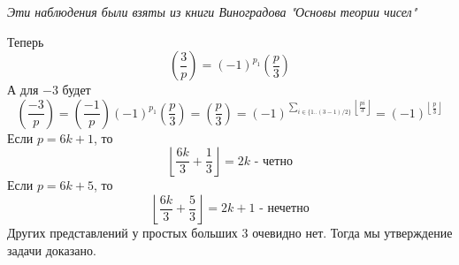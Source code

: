 \documentclass{article}
\begin{document}
\begin{enumerate}
        \textit{Эти наблюдения были взяты из книги Виноградова "Основы теории чисел"}

        Теперь
        \[\left(\frac{3}{p}\right)=(-1)^{p_1}\left(\frac{p}{3}\right)\]
        А для $-3$ будет
        \[\left(\frac{-3}{p}\right)=\left(\frac{-1}{p}\right)(-1)^{p_1}\left(\frac{p}{3}\right)
        =\left(\frac{p}{3}\right)=(-1)^{\sum_{i\in\{1..(3-1)/2\}}\left\lfloor\frac{pi}{3}\right\rfloor}
        =(-1)^{\left\lfloor\frac{p}{3}\right\rfloor}\]
        Если $p=6k+1$, то
        \[\left\lfloor\frac{6k}{3}+\frac{1}{3}\right\rfloor=2k\text{ - четно}\]
        Если $p=6k+5$, то
        \[\left\lfloor\frac{6k}{3}+\frac{5}{3}\right\rfloor=2k+1\text{ - нечетно}\]
        Других представлений у простых больших 3 очевидно нет. Тогда мы утверждение
        задачи доказано.

\end{enumerate}
\end{document}
